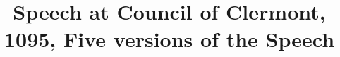 \documentclass{article}
\begin{document}
\title{Speech at Council of Clermont, 1095, Five versions of the Speech}
\maketitle
\end{document}
